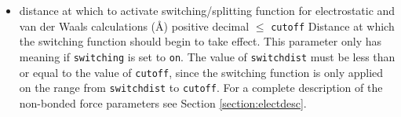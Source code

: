 \begin{itemize}


\item
{}
{distance at which to activate switching/splitting function 
for electrostatic and van der Waals calculations (\AA)}
{positive decimal $\leq$ {\tt cutoff}}
{Distance at which the switching function
should begin to take effect.  
This parameter only has meaning if {\tt switching} is 
set to {\tt on}.  
The value of {\tt switchdist} must be less than
or equal to the value of {\tt cutoff}, since the switching function
is only applied on the range from {\tt switchdist} to {\tt cutoff}.  
For a complete description of the non-bonded force parameters see
Section \ref{section:electdesc}.}


\end{itemize}
